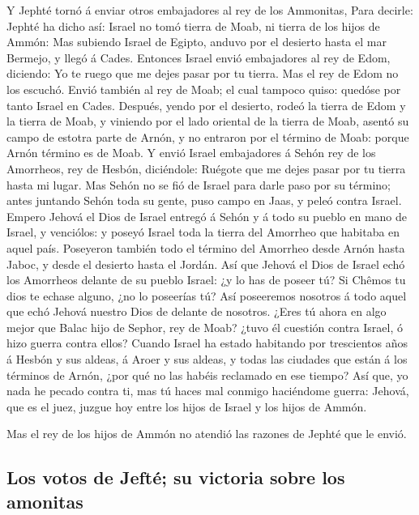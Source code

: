  Y Jephté tornó á enviar otros embajadores al rey de los
Ammonitas,  Para decirle: Jephté ha dicho así: Israel no
tomó tierra de Moab, ni tierra de los hijos de Ammón: 
Mas subiendo Israel de Egipto, anduvo por el desierto hasta el mar
Bermejo, y llegó á Cades.  Entonces Israel envió
embajadores al rey de Edom, diciendo: Yo te ruego que me dejes pasar por
tu tierra. Mas el rey de Edom no los escuchó. Envió también al rey de
Moab; el cual tampoco quiso: quedóse por tanto Israel en Cades.
 Después, yendo por el desierto, rodeó la tierra de Edom
y la tierra de Moab, y viniendo por el lado oriental de la tierra de
Moab, asentó su campo de estotra parte de Arnón, y no entraron por el
término de Moab: porque Arnón término es de Moab.  Y
envió Israel embajadores á Sehón rey de los Amorrheos, rey de Hesbón,
diciéndole: Ruégote que me dejes pasar por tu tierra hasta mi lugar.
 Mas Sehón no se fió de Israel para darle paso por su
término; antes juntando Sehón toda su gente, puso campo en Jaas, y peleó
contra Israel.  Empero Jehová el Dios de Israel entregó á
Sehón y á todo su pueblo en mano de Israel, y venciólos: y poseyó Israel
toda la tierra del Amorrheo que habitaba en aquel país. 
Poseyeron también todo el término del Amorrheo desde Arnón hasta Jaboc,
y desde el desierto hasta el Jordán.  Así que Jehová el
Dios de Israel echó los Amorrheos delante de su pueblo Israel: ¿y lo has
de poseer tú?  Si Chêmos tu dios te echase alguno, ¿no lo
poseerías tú? Así poseeremos nosotros á todo aquel que echó Jehová
nuestro Dios de delante de nosotros.  ¿Eres tú ahora en
algo mejor que Balac hijo de Sephor, rey de Moab? ¿tuvo él cuestión
contra Israel, ó hizo guerra contra ellos?  Cuando Israel
ha estado habitando por trescientos años á Hesbón y sus aldeas, á Aroer
y sus aldeas, y todas las ciudades que están á los términos de Arnón,
¿por qué no las habéis reclamado en ese tiempo?  Así que,
yo nada he pecado contra ti, mas tú haces mal conmigo haciéndome guerra:
Jehová, que es el juez, juzgue hoy entre los hijos de Israel y los hijos
de Ammón.

 Mas el rey de los hijos de Ammón no atendió las razones
de Jephté que le envió.

\hypertarget{los-votos-de-jeftuxe9-su-victoria-sobre-los-amonitas}{%
\subsection{Los votos de Jefté; su victoria sobre los
amonitas}\label{los-votos-de-jeftuxe9-su-victoria-sobre-los-amonitas}}

